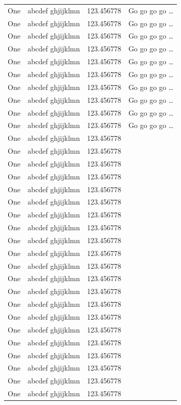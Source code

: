 \documentclass[phd,showframe]{ndsu-thesis-2022}
\begin{document}
{\begin{longtable}{l c c c }
One & abcdef ghjijklmn & 123.456778  & Go go go go \ldots \\
One & abcdef ghjijklmn & 123.456778  & Go go go go \ldots \\
One & abcdef ghjijklmn & 123.456778  & Go go go go \ldots \\
One & abcdef ghjijklmn & 123.456778  & Go go go go \ldots \\
One & abcdef ghjijklmn & 123.456778  & Go go go go \ldots \\
One & abcdef ghjijklmn & 123.456778  & Go go go go \ldots \\
One & abcdef ghjijklmn & 123.456778  & Go go go go \ldots \\
One & abcdef ghjijklmn & 123.456778  & Go go go go \ldots \\
One & abcdef ghjijklmn & 123.456778  & Go go go go \ldots \\
One & abcdef ghjijklmn & 123.456778  & Go go go go \ldots \\
One & abcdef ghjijklmn & 123.456778 \\
One & abcdef ghjijklmn & 123.456778 \\
One & abcdef ghjijklmn & 123.456778 \\
One & abcdef ghjijklmn & 123.456778 \\
One & abcdef ghjijklmn & 123.456778 \\
One & abcdef ghjijklmn & 123.456778 \\
One & abcdef ghjijklmn & 123.456778 \\
One & abcdef ghjijklmn & 123.456778 \\
One & abcdef ghjijklmn & 123.456778 \\
One & abcdef ghjijklmn & 123.456778 \\
One & abcdef ghjijklmn & 123.456778 \\
One & abcdef ghjijklmn & 123.456778 \\
One & abcdef ghjijklmn & 123.456778 \\
One & abcdef ghjijklmn & 123.456778 \\
One & abcdef ghjijklmn & 123.456778 \\
One & abcdef ghjijklmn & 123.456778 \\
One & abcdef ghjijklmn & 123.456778 \\
One & abcdef ghjijklmn & 123.456778 \\
One & abcdef ghjijklmn & 123.456778 \\
One & abcdef ghjijklmn & 123.456778 \\
One & abcdef ghjijklmn & 123.456778 \\

\end{longtable}}
\end{document}
